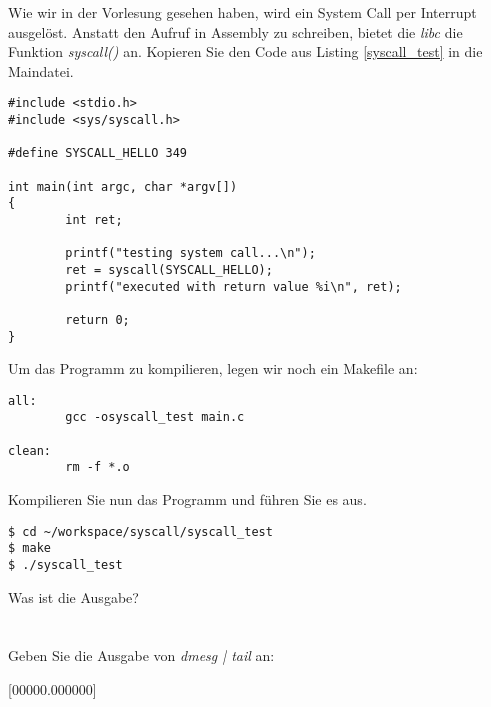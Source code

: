 Wie wir in der Vorlesung gesehen haben, wird ein System Call per Interrupt ausgelöst. Anstatt den Aufruf in Assembly zu schreiben, bietet
die \emph{libc} die Funktion \emph{syscall()} an. Kopieren Sie den Code aus Listing \ref{syscall_test} in die Maindatei.

\begin{lstlisting}[label=syscall_test,caption=workspace/syscall/main.c]
#include <stdio.h>
#include <sys/syscall.h>

#define SYSCALL_HELLO 349

int main(int argc, char *argv[])
{
        int ret;

        printf("testing system call...\n");
        ret = syscall(SYSCALL_HELLO);
        printf("executed with return value %i\n", ret);

        return 0;
}
\end{lstlisting} \hfill

Um das Programm zu kompilieren, legen wir noch ein Makefile an:
\begin{lstlisting}[caption=workspace/syscall/Makefile]
all:
        gcc -osyscall_test main.c

clean:
        rm -f *.o
\end{lstlisting}\hfill

Kompilieren Sie nun das Programm und führen Sie es aus.
\begin{lstlisting}
$ cd ~/workspace/syscall/syscall_test
$ make
$ ./syscall_test
\end{lstlisting} \hfill

Was ist die Ausgabe? \\

\underline{\hspace{\textwidth}} \\
\underline{\hspace{\textwidth}} \\

Geben Sie die Ausgabe von \emph{dmesg | tail} an:

[00000.000000] \underline{\hspace{0.5\textwidth}} \newline
[00000.000000] \underline{\hspace{0.5\textwidth}} \newline
[00000.000000] \underline{\hspace{0.5\textwidth}} \newline
[00000.000000] \underline{\hspace{0.5\textwidth}} \newline
[00000.000000] \underline{\hspace{0.5\textwidth}} \newline
[00000.000000] \underline{\hspace{0.5\textwidth}} \newline
[00000.000000] \underline{\hspace{0.5\textwidth}} \newline

